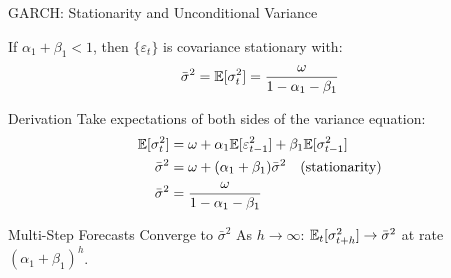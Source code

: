 \documentclass[9pt, aspectratio=169, t]{beamer}
\begin{document}
\begin{frame}{GARCH: Stationarity and Unconditional Variance}
    \vspace{-0.2cm}
    \begin{thm}
        If $\alpha_1 + \beta_1 < 1$, then $\{\varepsilon_t\}$ is covariance stationary with:
        \[
        \bar{\sigma}^2 = \mathbb{E}[\sigma_t^2] = \frac{\omega}{1 - \alpha_1 - \beta_1}
        \]
    \end{thm}

    \vspace{-0.05cm}

    {\small
    \begin{exampleblock}{Derivation}
        Take expectations of both sides of the variance equation:
        \begin{align*}
            \mathbb{E}[\sigma_t^2] &= \omega + \alpha_1 \mathbb{E}[\varepsilon_{t-1}^2] + \beta_1 \mathbb{E}[\sigma_{t-1}^2] \\
            \bar{\sigma}^2 &= \omega + (\alpha_1 + \beta_1)\bar{\sigma}^2 \quad \text{(stationarity)} \\
            \bar{\sigma}^2 &= \frac{\omega}{1 - \alpha_1 - \beta_1}
        \end{align*}
    \end{exampleblock}
    }

    \vspace{-0.2cm}

    \begin{alertblock}{Multi-Step Forecasts Converge to $\bar{\sigma}^2$}
        As $h \to \infty$: $\mathbb{E}_t[\sigma_{t+h}^2] \to \bar{\sigma}^2$ at rate $(\alpha_1 + \beta_1)^h$.
    \end{alertblock}
\end{frame}
\end{document}
